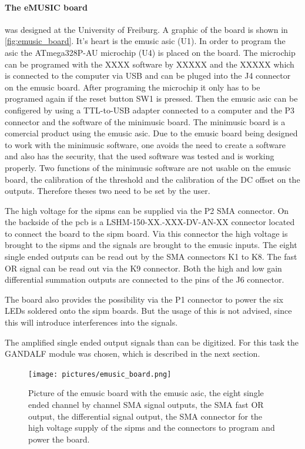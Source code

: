 \paragraph{The eMUSIC board} was designed at the University of Freiburg.
A graphic of the board is shown in \autoref{fig:emusic_board}.
It's heart is the \ac{emusic} \ac{asic} (U1).
In order to program the \ac{asic} the ATmega328P-AU microchip (U4) is placed on the board.
The microchip can be programed with the XXXX software by XXXXX and the XXXXX which is connected to the computer via USB and can be pluged into the J4 connector on the \ac{emusic} board.
After programing the microchip it only has to be programed again if the reset button SW1 is pressed.
Then the \ac{emusic} \ac{asic} can be configered by using a TTL-to-USB adapter connected to a computer and the P3 connector and the software of the minimusic board.
The minimusic board is a comercial product using the \ac{emusic} \ac{asic}.
Due to the \ac{emusic} board being designed to work with the minimusic software, one avoids the need to create a software and also has the security, that the used software was tested and is working properly.
Two functions of the minimusic software are not usable on the \ac{emusic} board, the calibration of the threshold and the calibration of the DC offset on the outputs.
Therefore theses two need to be set by the user.

The high voltage for the \acp{sipm} can be supplied via the P2 SMA connector.
On the backside of the \ac{pcb} is a LSHM-150-XX.-XXX-DV-AN-XX connector located to connect the board to the \ac{sipm} board.
Via this connector the high voltage is brought to the \acp{sipm} and the signals are brought to the \ac{emusic} inputs.
The eight single ended outputs can be read out by the SMA connectors K1 to K8.
The fast OR signal can be read out via the K9 connector.
Both the high and low gain differential summation outputs are connected to the pins of the J6 connector.

The board also provides the possibility via the P1 connector to power the six LEDs soldered onto the \ac{sipm} boards.
But the usage of this is not advised, since this will introduce interferences into the signals.

The amplified single ended output signals than can be digitized.
For this task the GANDALF module was chosen, which is described in the next section.

\begin{figure}
	\centering
	\texttt{[image: pictures/emusic\_board.png]}
	\caption[eMUSIC Board]{Picture of the \ac{emusic} board with the \ac{emusic} \ac{asic}, the eight single ended channel by channel SMA signal outputs, the SMA fast OR output, the differential signal output, the SMA connector for the high voltage supply of the \acp{sipm} and the connectors to program and power the board.}
	\label{fig:emusic_board}
\end{figure}





